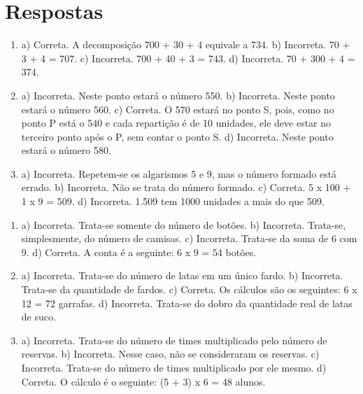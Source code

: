 \chapter{Respostas}
\pagestyle{plain}
\footnotesize

\pagecolor{gray!40}


\begin{enumerate}
\item 
a) Correta. A decomposição 700 + 30 + 4 equivale a 734.
b) Incorreta. 70 + 3 + 4 = 707.
c) Incorreta. 700 + 40 + 3 = 743.
d) Incorreta. 70 + 300 + 4 = 374.

\item
a) Incorreta. Neste ponto estará o número 550.
b) Incorreta. Neste ponto estará o número 560.
c) Correta. O 570 estará no ponto S, pois, como no ponto P está o 540 e cada
repartição é de 10 unidades, ele deve estar no terceiro ponto após o P,
sem contar o ponto S.
d) Incorreta. Neste ponto estará o número 580.

\item
a) Incorreta. Repetem-se os algarismos 5 e 9, mas o número formado está errado.
b) Incorreta. Não se trata do número formado.
c) Correta. 5 x 100 + 1 x 9 = 509.
d) Incorreta. 1.509 tem 1000 unidades a mais do que 509.
\end{enumerate}


\begin{enumerate}
\item
a) Incorreta. Trata-se somente do número de botões.
b) Incorreta. Trata-se, simplesmente, do número de camisas.
c) Incorreta. Trata-se da soma de 6 com 9.
d) Correta. A conta é a seguinte: 6 x 9 = 54 botões.

\item
a) Incorreta. Trata-se do número de latas em um único fardo.
b) Incorreta. Trata-se da quantidade de fardos.
c) Correta. Os cálculos são os seguintes: 6 x 12 = 72 garrafas.
d) Incorreta. Trata-se do dobro da quantidade real de latas de suco.

\item
a) Incorreta. Trata-se do número de times multiplicado pelo número de reservas.
b) Incorreta. Nesse caso, não se consideraram os reservas.
c) Incorreta. Trata-se do número de times multiplicado por ele mesmo.
d) Correta. O cálculo é o seguinte: (5 + 3) x 6 = 48 alunos.
\end{enumerate}


